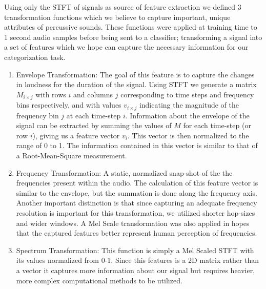\documentclass[\main/thesis.tex]{subfiles}
\begin{document}
Using only the STFT of signals as source of feature extraction we defined 3 transformation functions which we believe to capture important, unique attributes of percussive sounds.  These functions were applied at training time to 1 second audio samples before being sent to a classifier; transforming a signal into a set of features which we hope can capture the necessary information for our categorization task. 


\begin{enumerate}
\item Envelope Transformation: The goal of this feature is to capture the changes in loudness for the duration of the signal. Using STFT we generate a matrix $M_{i \times j}$ with rows $i$ and columns $j$ corresponding to time steps and frequency bins respectively, and with values $v_{i \times j}$ indicating the magnitude of the frequency bin $j$ at each time-step $i$. Information about the envelope of the signal can be extracted by summing the values of $M$ for each time-step (or row $i$), giving us a feature vector $v_i$. This vector is then normalized to the range of 0 to 1. The information contained in this vector is similar to that of a Root-Mean-Square measurement.
\item Frequency Transformation: A static, normalized snap-shot of the the frequencies present within the audio. The calculation of this feature vector is similar to the envelope, but the summation is done along the frequency axis. Another important distinction is that since capturing an adequate frequency resolution is important for this transformation, we utilized shorter hop-sizes and wider windows. A Mel Scale transformation was also applied in hopes that the captured features better represent human perception of frequencies. 
\item Spectrum Transformation: This function is simply a Mel Scaled STFT with its values normalized from 0-1. Since this features is a 2D matrix rather than a vector it captures more information about our signal but requires heavier, more complex computational methods to be utilized. 
\end{enumerate}
\end{document}
